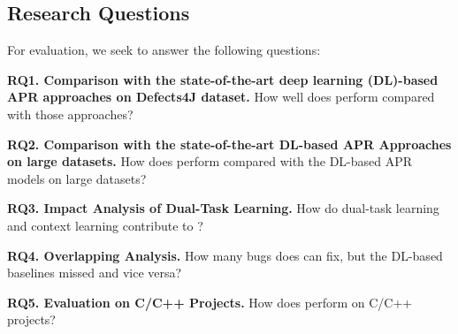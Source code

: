 \subsection{Research Questions}

For evaluation, we seek to answer the following questions:

\noindent\textbf{RQ1. Comparison with the state-of-the-art deep learning
  (DL)-based APR approaches on Defects4J dataset.}  How well does
                {\tool} perform compared with those approaches?



\noindent\textbf{RQ2. Comparison with the state-of-the-art DL-based APR Approaches on large datasets.}  
How does {\tool} perform compared with the DL-based APR models on large datasets?




\noindent\textbf{RQ3. Impact Analysis of Dual-Task Learning.} How do
dual-task learning and context learning contribute to {\tool}?

\noindent\textbf{RQ4. Overlapping Analysis.} How many bugs does
                {\tool} can fix, but the DL-based baselines missed and
                vice versa?

\noindent\textbf{RQ5. Evaluation on C/C++ Projects.} How does {\tool} perform on C/C++ projects?

